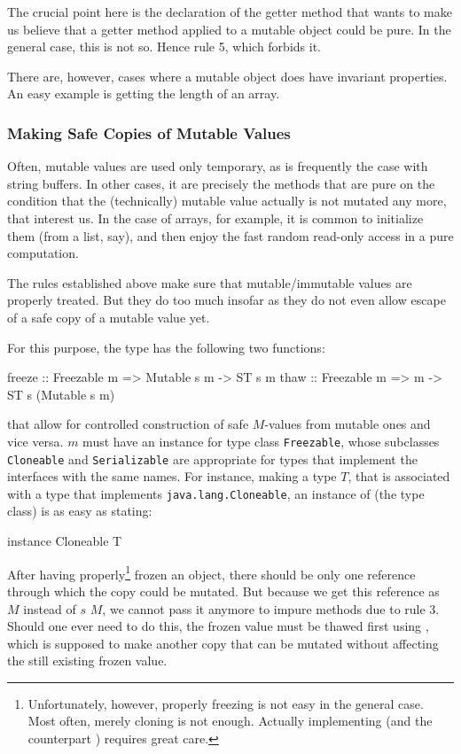 The crucial point here is the declaration of the getter method that wants to make us believe that a getter method applied to a mutable object could be pure. In the general case, this is not so. Hence rule 5, which forbids it.

There are, however, cases where a mutable object does have invariant properties. An easy example is getting the length of an array.

\subsubsection{Making Safe Copies of Mutable Values}

Often, mutable values are used only temporary, as is frequently the case with string buffers. 
In other cases, it are precisely the methods that are pure on the condition that the (technically) mutable value actually is not mutated any more, that interest us.
In the case of arrays, for example, it is common to initialize them (from a list, say), and then enjoy the fast random read-only access in a pure computation.

The rules established above make sure that mutable/immutable values are properly treated. But they do too much insofar as they do not even allow escape of a safe copy of a mutable value yet.

For this purpose, the  type has the following two functions:

\begin{code}
freeze :: Freezable m => Mutable s m -> ST s m
thaw   :: Freezable m => m -> ST s (Mutable s m)
\end{code}

that allow for controlled construction of safe $M$-values from mutable ones and vice versa. $m$ must have an instance for type class \texttt{Freezable}, whose subclasses \texttt{Cloneable} and \texttt{Serializable} are appropriate for \java{} types that implement the \java{} interfaces with the same names. For instance, making a type $T$, that is associated with a \java{} type that implements \texttt{java.lang.Cloneable}, an instance of  (the type class)  is as easy as stating:

\begin{code}
instance Cloneable T
\end{code}

After having properly\footnote{
Unfortunately, however, properly freezing is not easy in the general case. Most often, merely cloning is not enough. Actually implementing  (and the counterpart ) requires great care.}
frozen an object, there should be only one reference through which the copy could be mutated. But because we get this reference as $M$ instead of  $s$ $M$, we cannot pass it anymore to impure methods due to rule 3. Should one ever need to do this, the frozen value must be thawed first using , which is supposed to make another copy that can be mutated without affecting the still existing frozen value.

